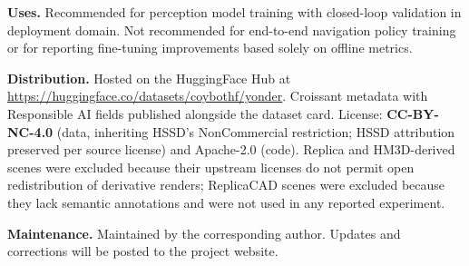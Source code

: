 \documentclass{article}
\begin{document}
\textbf{Uses.} Recommended for perception model training with closed-loop validation in deployment domain. Not recommended for end-to-end navigation policy training or for reporting fine-tuning improvements based solely on offline metrics.

\textbf{Distribution.} Hosted on the HuggingFace Hub at \url{https://huggingface.co/datasets/coybothf/yonder}. Croissant metadata with Responsible AI fields published alongside the dataset card. License: \textbf{CC-BY-NC-4.0} (data, inheriting HSSD's NonCommercial restriction; HSSD attribution preserved per source license) and Apache-2.0 (code). Replica and HM3D-derived scenes were excluded because their upstream licenses do not permit open redistribution of derivative renders; ReplicaCAD scenes were excluded because they lack semantic annotations and were not used in any reported experiment.

\textbf{Maintenance.} Maintained by the corresponding author. Updates and corrections will be posted to the project website.
\end{document}
